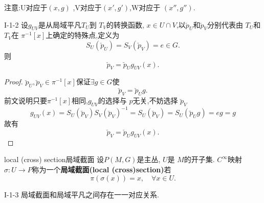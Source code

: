 \documentclass[../main.tex]{subfiles}
\begin{document}
\begin{note}
 注意:U对应于$(x,g)$ ,V对应于$(x',g')$,W对应于 $(x'',g'')$.
\end{note}
\begin{theorem}
  {}{I-1-2} 
  设$g_{UV}$是从局域平凡$T_U$到 $T_V$的转换函数, $x\in  U \cap V$,以$\breve{p}_U$和$\breve{p}_V$分别代表由 $T_U$和$T_V$在 $\pi^{-1}[x]$上确定的特殊点,定义为
  \[
    S_U(\breve{p}_U) = S_V(\breve{p}_V) = e \in  G
  .\]则
  \[
    \breve{p}_V = \breve{p}_U g_{UV}(x)
  .\] 
\end{theorem}
\begin{proof}
  $\breve{p}_U,\breve{p}_V \in \pi^{-1}[x]$保证$\exists g \in G$使\[
    \breve{p}_V = \breve{p}_U g
  .\]  
  前文说明只要$\pi^{-1}[x]$相同,$g_{UV}$的选择与 $p$无关,不妨选择 $\breve{p}_V$
  \begin{equation*}
    g_{UV}(x) = S_U(\breve{p}_V)S_V(\breve{p}_V)^{-1} = S_U(\breve{p}_V) = S_U(\breve{p}_Ug) = eg = g
  \end{equation*}
  故有\[
    \breve{p}_V = \breve{p}_U g_{UV}(x)
  .\] 
\end{proof}
\begin{definition}
  {local (cross) section}{局域截面}
  设$P(M,G)$是主丛, $U$是 $M$的开子集. $C^\infty$映射 $\sigma: U \to P$称为一个\textbf{局域截面(local (cross)section)}若\[
  \pi(\sigma(x)) = x, \quad \forall x \in U
  .\] 
\end{definition}
\begin{theorem}
  {}{I-1-3}
  局域截面和局域平凡之间存在一一对应关系.
\end{theorem}
\end{document}
